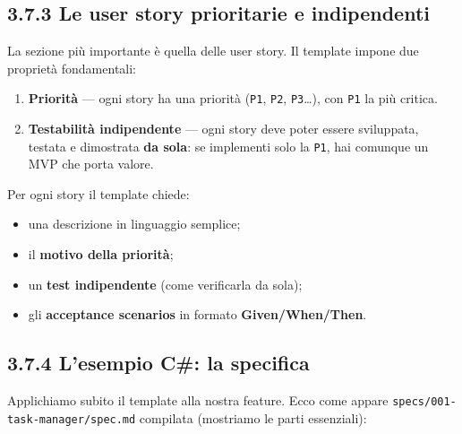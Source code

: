 \documentclass[
  italian,
  10pt,
]{book}
\providecommand{\tightlist}{%
  \setlength{\itemsep}{0pt}\setlength{\parskip}{0pt}}
\begin{document}
\subsection{3.7.3 Le user story prioritarie e
indipendenti}\label{le-user-story-prioritarie-e-indipendenti}

La sezione più importante è quella delle user story. Il template impone
due proprietà fondamentali:

\begin{enumerate}
\def\labelenumi{\arabic{enumi}.}
\tightlist
\item
  \textbf{Priorità} --- ogni story ha una priorità (\texttt{P1},
  \texttt{P2}, \texttt{P3}\ldots), con \texttt{P1} la più critica.
\item
  \textbf{Testabilità indipendente} --- ogni story deve poter essere
  sviluppata, testata e dimostrata \textbf{da sola}: se implementi solo
  la \texttt{P1}, hai comunque un MVP che porta valore.
\end{enumerate}

Per ogni story il template chiede:

\begin{itemize}
\tightlist
\item
  una descrizione in linguaggio semplice;
\item
  il \textbf{motivo della priorità};
\item
  un \textbf{test indipendente} (come verificarla da sola);
\item
  gli \textbf{acceptance scenarios} in formato \textbf{Given/When/Then}.
\end{itemize}

\subsection{3.7.4 L'esempio C\#: la
specifica}\label{lesempio-c-la-specifica}

Applichiamo subito il template alla nostra feature. Ecco come appare
\texttt{specs/001-task-manager/spec.md} compilata (mostriamo le parti
essenziali):
\end{document}
